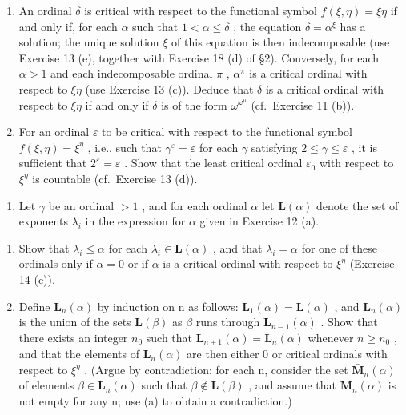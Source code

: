 \begin{enumerate}
\def\labelenumi{(\alph{enumi})}
\setcounter{enumi}{1}
\item
  An ordinal \(\delta\) is critical with respect to the functional symbol \(f(\xi, \eta) = \xi \eta\) if and only if, for each \(\alpha\) such that \(1 < \alpha \leqslant \delta\) , the equation \(\delta = \alpha^{\xi}\) has a solution; the unique solution \(\xi\) of this equation is then indecomposable (use Exercise 13 (e), together with Exercise 18 (d) of §2). Conversely, for each \(\alpha > 1\) and each indecomposable ordinal \(\pi\) , \(\alpha^{\pi}\) is a critical ordinal with respect to \(\xi \eta\) (use Exercise 13 (c)). Deduce that \(\delta\) is a critical ordinal with respect to \(\xi \eta\) if and only if \(\delta\) is of the form \(\omega^{\omega^{\mu}}\) (cf.~Exercise 11 (b)).
\item
  For an ordinal \(\varepsilon\) to be critical with respect to the functional symbol \(f(\xi, \eta) = \xi^{\eta}\) , i.e., such that \(\gamma^{\varepsilon} = \varepsilon\) for each \(\gamma\) satisfying \(2 \leqslant \gamma \leqslant \varepsilon\) , it is sufficient that \(2^{\varepsilon} = \varepsilon\) . Show that the least critical ordinal \(\varepsilon_0\) with respect to \(\xi^{\eta}\) is countable (cf.~Exercise 13 (d)).
\end{enumerate}

\begin{enumerate}
\def\labelenumi{\arabic{enumi}.}
\setcounter{enumi}{14}
\tightlist
\item
  Let \(\gamma\) be an ordinal \(>1\) , and for each ordinal \(\alpha\) let \(\mathbf{L}(\alpha)\) denote the set of exponents \(\lambda_{i}\) in the expression for \(\alpha\) given in Exercise 12 (a).
\end{enumerate}

\begin{enumerate}
\def\labelenumi{(\alph{enumi})}
\item
  Show that \(\lambda_{i} \leqslant \alpha\) for each \(\lambda_{i} \in \mathbf{L}(\alpha)\) , and that \(\lambda_{i} = \alpha\) for one of these ordinals only if \(\alpha = 0\) or if \(\alpha\) is a critical ordinal with respect to \(\xi^{\eta}\) (Exercise 14 (c)).
\item
  Define \(\mathbf{L}_{n}(\alpha)\) by induction on n as follows: \(\mathbf{L}_{1}(\alpha)=\mathbf{L}(\alpha)\) , and \(\mathbf{L}_{n}(\alpha)\) is the union of the sets \(\mathbf{L}(\beta)\) as \(\beta\) runs through \(\mathbf{L}_{n-1}(\alpha)\) . Show that there exists an integer \(n_{0}\) such that \(\mathbf{L}_{n+1}(\alpha)=\mathbf{L}_{n}(\alpha)\) whenever \(n\geqslant n_{0}\) , and that the elements of \(\mathbf{L}_{n}(\alpha)\) are then either 0 or critical ordinals with respect to \(\xi^{\eta}\) . (Argue by contradiction: for each n, consider the set \(\bar{\mathbf{M}}_{n}(\alpha)\) of elements \(\beta\in\mathbf{L}_{n}(\alpha)\) such that \(\beta\notin\mathbf{L}(\beta)\) , and assume that \(\mathbf{M}_{n}(\alpha)\) is not empty for any n; use (a) to obtain a contradiction.)
\end{enumerate}

